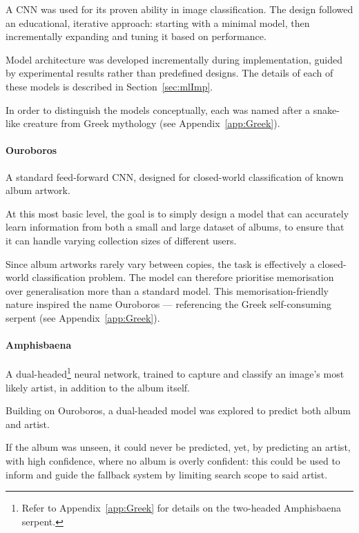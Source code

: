                 A CNN was used for its proven ability in image classification. The design followed an educational, iterative approach: starting with a minimal model, then incrementally expanding and tuning it based on performance.
                
                Model architecture was developed incrementally during implementation, guided by experimental results rather than predefined designs. The details of each of these models is described in Section~\ref{sec:mlImp}.
    
                In order to distinguish the models conceptually, each was named after a snake-like creature from Greek mythology (see Appendix~\ref{app:Greek}).
    
                \paragraph{Ouroboros} A standard feed-forward CNN, designed for closed-world classification of known album artwork.
    
                At this most basic level, the goal is to simply design a model that can accurately learn information from both a small and large dataset of albums, to ensure that it can handle varying collection sizes of different users.
    
                Since album artworks rarely vary between copies, the task is effectively a closed-world classification problem. The model can therefore prioritise memorisation over generalisation more than a standard model. This memorisation-friendly nature inspired the name Ouroboros — referencing the Greek self-consuming serpent (see Appendix~\ref{app:Greek}).
    
                \paragraph{Amphisbaena} A dual-headed\footnote{Refer to Appendix~\ref{app:Greek} for details on the two-headed Amphisbaena serpent.} neural network, trained to capture and classify an image's most likely artist, in addition to the album itself.
    
                Building on Ouroboros, a dual-headed model was explored to predict both album and artist.
    
                If the album was unseen, it could never be predicted, yet, by predicting an artist, with high confidence, where no album is overly confident: this could be used to inform and guide the fallback system by limiting search scope to said artist.
    
